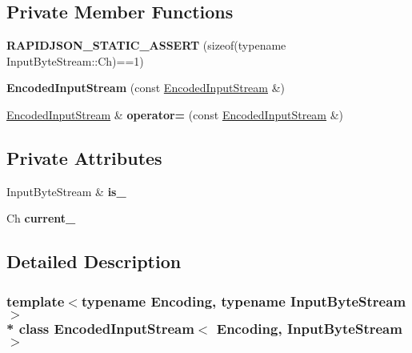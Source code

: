 \subsection*{Private Member Functions}
\begin{DoxyCompactItemize}
\item 
{\bfseries R\+A\+P\+I\+D\+J\+S\+O\+N\+\_\+\+S\+T\+A\+T\+I\+C\+\_\+\+A\+S\+S\+E\+RT} (sizeof(typename Input\+Byte\+Stream\+::\+Ch)==1)\hypertarget{class_encoded_input_stream_acc6c2b46e636edfeb81dfaea80ee384a}{}\label{class_encoded_input_stream_acc6c2b46e636edfeb81dfaea80ee384a}

\item 
{\bfseries Encoded\+Input\+Stream} (const \hyperlink{class_encoded_input_stream}{Encoded\+Input\+Stream} \&)\hypertarget{class_encoded_input_stream_a672ac1977918f6da245de0820d41b77e}{}\label{class_encoded_input_stream_a672ac1977918f6da245de0820d41b77e}

\item 
\hyperlink{class_encoded_input_stream}{Encoded\+Input\+Stream} \& {\bfseries operator=} (const \hyperlink{class_encoded_input_stream}{Encoded\+Input\+Stream} \&)\hypertarget{class_encoded_input_stream_aebee85cf36e2aa4ed25881a95678c4c4}{}\label{class_encoded_input_stream_aebee85cf36e2aa4ed25881a95678c4c4}

\end{DoxyCompactItemize}
\subsection*{Private Attributes}
\begin{DoxyCompactItemize}
\item 
Input\+Byte\+Stream \& {\bfseries is\+\_\+}\hypertarget{class_encoded_input_stream_ab07b45f34f288184313750af5f7077b6}{}\label{class_encoded_input_stream_ab07b45f34f288184313750af5f7077b6}

\item 
Ch {\bfseries current\+\_\+}\hypertarget{class_encoded_input_stream_a20b49879c87fdf6d6ba20e99f0cf7893}{}\label{class_encoded_input_stream_a20b49879c87fdf6d6ba20e99f0cf7893}

\end{DoxyCompactItemize}


\subsection{Detailed Description}
\subsubsection*{template$<$typename Encoding, typename Input\+Byte\+Stream$>$\\*
class Encoded\+Input\+Stream$<$ Encoding, Input\+Byte\+Stream $>$}

